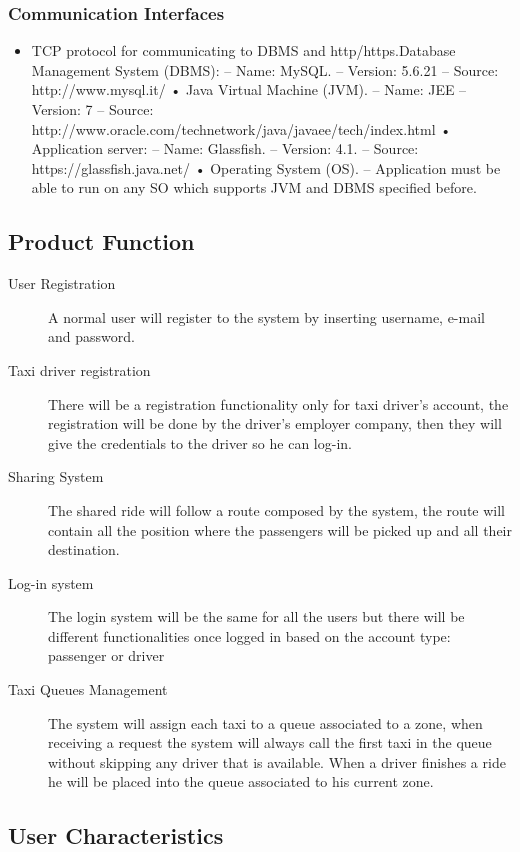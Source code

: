 	\subsubsection{Communication Interfaces}
		\begin{itemize}
			\item TCP protocol for communicating to DBMS and http/https.Database Management System (DBMS):
			– Name: MySQL.
			– Version: 5.6.21
			– Source: http://www.mysql.it/
			• Java Virtual Machine (JVM).
			– Name: JEE
			– Version: 7
			– Source: http://www.oracle.com/technetwork/java/javaee/tech/index.html
			• Application server:
			– Name: Glassfish.
			– Version: 4.1.
			– Source: https://glassfish.java.net/
			• Operating System (OS).
			– Application must be able to run on any SO which supports JVM and
			DBMS specified before.
		\end{itemize}
		
\subsection{Product Function}
	\begin{description}
		\item [User Registration] A normal user will register to the system by inserting username, e-mail and password.
		\item [Taxi driver registration] There will be a registration functionality only for taxi driver's account, the registration will be done by the driver's employer company, then they will give the credentials to the driver so he can log-in.
		\item [Sharing System] The shared ride will follow a route composed by the system, the route will contain all the position where the passengers will be picked up and all their destination.
		\item [Log-in system] The login system will be the same for all the users but there will be different functionalities once logged in based on the account type: passenger or driver
		\item [Taxi Queues Management] The system will assign each taxi to a queue associated to a zone, when receiving a request the system will always call the first taxi in the queue without skipping any driver that is available. When a driver finishes a ride he will be placed into the queue associated to his current zone.
	\end{description}
	
\subsection{User Characteristics}

